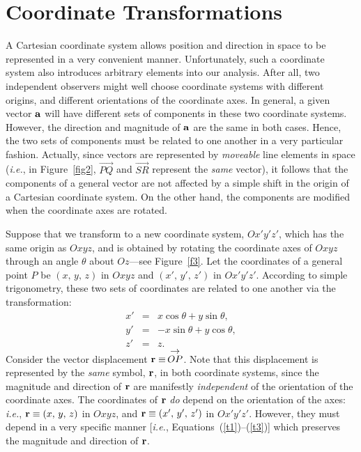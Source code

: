 \section{Coordinate Transformations}\label{stransx}
A Cartesian coordinate system allows  position and direction in space to be represented in a very convenient
manner. Unfortunately, such a coordinate system also introduces arbitrary elements into our analysis. After all, two independent observers might well choose coordinate systems with different origins, and
different orientations of the coordinate axes. In general, a given vector ${\bf a}$ will have different
sets of components in these two coordinate systems. However, the direction and magnitude of ${\bf a}$ are the
same in both cases. Hence, the two sets of components must be related to one another in a very particular fashion.  
Actually, since vectors are represented by {\em moveable}\/ line elements in space ({\em i.e.},  in Figure~\ref{fig2},  $\stackrel{\displaystyle \rightarrow}{PQ}$ and  $\stackrel{\displaystyle \rightarrow}{SR}$ represent the {\em same}\/ vector), it follows that
the components of a general vector are not affected by a simple shift in the origin of a Cartesian coordinate system. On the other hand, the
components are modified when the coordinate axes are rotated. 

Suppose that we transform to a new coordinate system, $Ox'y'z'$, which has the
same origin as $Oxyz$, and is obtained by 
rotating the coordinate axes of $Oxyz$ through an angle
$\theta$ about  $Oz$---see Figure~\ref{f3}.
Let the coordinates of a general point $P$ be $(x,\,y,\,z)$ in $Oxyz$ and $(x',\, y',\, z')$ in $Ox'y'z'$. According to simple trigonometry, these two sets of coordinates are related to one another via the transformation:
\begin{eqnarray}
x' &=& x\cos\theta + y\sin \theta,\label{t1}\\[0.5ex]
y' &=& -x\sin\theta + y\cos\theta,\label{t2}\\[0.5ex]
z' &=& z.\label{t3}
\end{eqnarray}
Consider the vector displacement ${\bf r} \equiv\, \stackrel{\displaystyle \rightarrow}{OP}$. 
Note that this displacement is represented by the {\em same}\/ symbol, ${\bf r}$, in both
coordinate systems, since the magnitude and
direction of ${\bf r}$ are manifestly {\em independent}\/ of the orientation of the coordinate axes. The
coordinates of ${\bf r}$ {\em do}\/ depend on the orientation of the axes: {\em i.e.}, ${\bf r}\equiv (x,\,y,\,z)$ in $Oxyz$, and
${\bf r}\equiv (x',\,y',\,z')$ in $Ox'y'z'$. 
However, they must depend in a very specific manner [{\em i.e.}, Equations~(\ref{t1})--(\ref{t3})] which
preserves the magnitude and direction of ${\bf r}$.

